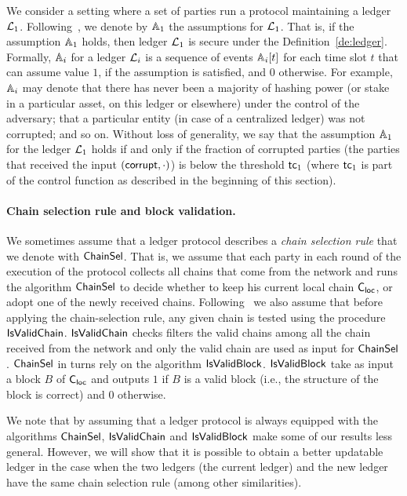 We consider a setting where a set of parties run a protocol maintaining a ledger $\mathcal{L}_1$. Following~\cite{SP:GazKiaZin19}, we denote by $\mathbb{A}_1$
the assumptions for $\mathcal{L}_1$.
 That is, if the assumption $\mathbb{A}_1$ holds, then ledger $\mathcal{L}_1$ is secure under the Definition~\ref{de:ledger}.
Formally, $\mathbb{A}_i$ for a ledger $\mathcal{L}_i$ is a sequence of events $\mathbb{A}_i[t]$ for each time slot $t$ that can assume value $1$,
if the assumption is satisfied, and $0$ otherwise.
For example, $\mathbb{A}_i$ may denote that
there has never been a majority of hashing power (or stake in a particular
asset, on this ledger or elsewhere) under the control of the adversary; that a
particular entity (in case of a centralized ledger) was not corrupted; and so
on.
Without loss of generality, we say that the assumption $\mathbb{A}_1$ for the ledger $\mathcal{L}_1$ holds if and only if the fraction of corrupted parties (the parties
that received the input $(\mathsf{corrupt}, \cdot)$) is below the threshold $\mathsf{tc}_1$ (where $\mathsf{tc}_1$ is part of the control function as described in the beginning
of this section).

\paragraph{Chain selection rule and block validation.} We sometimes assume that a ledger protocol describes a \emph{chain selection rule} that we denote with $\mathsf{ChainSel}$.
That is, we assume that  each party in each round of the execution of the protocol collects all chains that come from the network and runs the algorithm $\mathsf{ChainSel}$ to decide whether to keep his current local chain $\mathsf{C_{loc}}$, or adopt one of the newly received chains. 
Following~\cite{C:BMTZ17} we also assume 
that before applying the chain-selection rule, any given chain is tested
 using the procedure $\mathsf{IsValidChain}$. $\mathsf{IsValidChain}$ checks filters the
 valid chains among all the chain received from the network and only
 the valid chain are used as input for $\mathsf{ChainSel}$.
 $\mathsf{ChainSel}$ in turns rely on the algorithm $\mathsf{IsValidBlock}$.
 $\mathsf{IsValidBlock}$ take as input a block $B$ of $\mathsf{C_{loc}}$ and outputs $1$ if $B$ is a valid block (i.e., the structure of
 the block is correct) and  $0$ otherwise.
 
 
 We note that by assuming that a ledger protocol is always equipped with the algorithms $\mathsf{ChainSel}$, 
 $\mathsf{IsValidChain}$ and $\mathsf{IsValidBlock}$ make some of our results less general. However, we will show that it is possible to
obtain a better updatable ledger in the case when the two ledgers (the current ledger) and the new ledger have the same chain selection rule (among other similarities).


